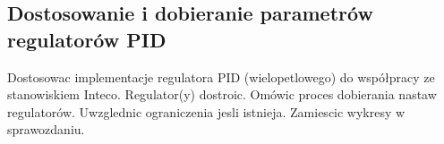 \subsection{Dostosowanie i dobieranie parametrów regulatorów PID}
\label{lab:zad10}


%    

Dostosowac implementacje regulatora PID (wielopetlowego) do współpracy ze stanowiskiem
Inteco. Regulator(y) dostroic. Omówic proces dobierania nastaw regulatorów.
Uwzglednic ograniczenia jesli istnieja. Zamiescic wykresy w sprawozdaniu.

\newpage
